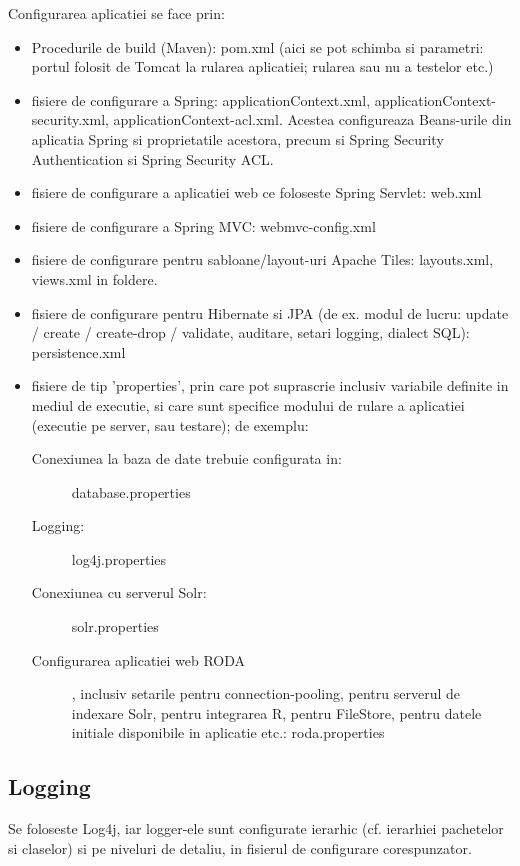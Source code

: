 Configurarea aplicatiei se face prin:
\begin {itemize}
\item Procedurile de build (Maven):
pom.xml
(aici se pot schimba si parametri: portul folosit de Tomcat la rularea aplicatiei; rularea sau nu a testelor etc.)
\item
fisiere de configurare a Spring: applicationContext.xml,
applicationContext-security.xml, applicationContext-acl.xml. 
Acestea configureaza Beans-urile din aplicatia Spring si proprietatile acestora, precum si Spring Security Authentication si Spring Security ACL.
\item
fisiere de configurare a aplicatiei web ce foloseste Spring Servlet:
web.xml
\item
fisiere de configurare a Spring MVC: 
webmvc-config.xml
\item
fisiere de configurare pentru sabloane/layout-uri Apache Tiles: 
layouts.xml, views.xml in foldere.
\item 
fisiere de configurare pentru Hibernate si JPA (de ex. modul de lucru: update / create / create-drop /
validate, auditare, setari logging, dialect SQL):
persistence.xml
\item
fisiere de tip 'properties', prin care pot suprascrie
inclusiv variabile definite in mediul de executie, si care sunt specifice modului de rulare a
aplicatiei (executie pe server, sau testare); de exemplu: 
\begin{description}
\item[Conexiunea la baza de date trebuie configurata in:]
database.properties
\item[Logging:]
log4j.properties
\item[Conexiunea cu serverul Solr:]
solr.properties
\item[Configurarea aplicatiei web RODA], inclusiv setarile pentru connection-pooling, pentru serverul de indexare
Solr, pentru integrarea R, pentru FileStore, pentru datele initiale disponibile
in aplicatie etc.:
roda.properties
\end{description}
\end{itemize}

\subsection{Logging}
Se foloseste Log4j, iar logger-ele sunt configurate ierarhic (cf. ierarhiei
pachetelor si claselor) si pe niveluri de detaliu, in fisierul de
configurare corespunzator.

